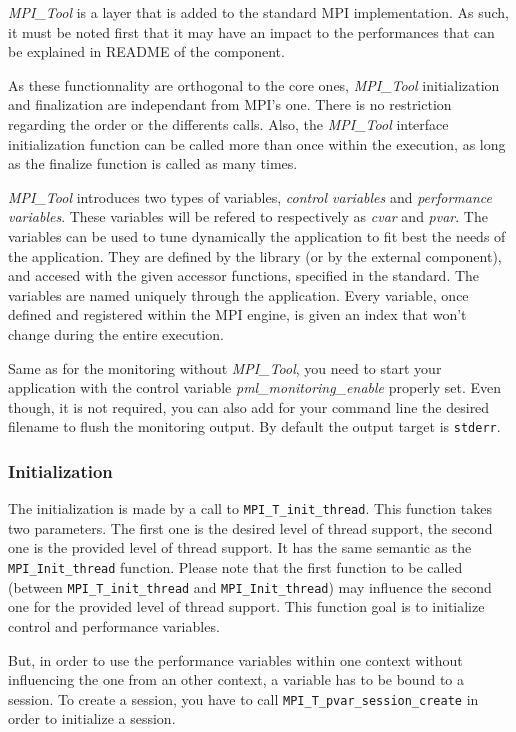 \documentclass[notitlepage]{article}
\newcommand{\mpit}[1]{\textit{MPI\_Tool#1}}
\begin{document}
\mpit{} is a layer that is added to the standard MPI
implementation. As such, it must be noted first that it may have an
impact to the performances that can be explained in README of the
component.

As these functionnality are orthogonal to the core ones, \mpit{}
initialization and finalization are independant from MPI's one. There
is no restriction regarding the order or the differents calls. Also,
the \mpit{} interface initialization function can be called more than
once within the execution, as long as the finalize function is called
as many times.

\mpit{} introduces two types of variables, \textit{control variables}
and \textit{performance variables}. These variables will be refered to
respectively as \textit{cvar} and \textit{pvar}. The variables can be
used to tune dynamically the application to fit best the needs of the
application. They are defined by the library (or by the external
component), and accesed with the given accessor functions, specified
in the standard. The variables are named uniquely through the
application. Every variable, once defined and registered within the
MPI engine, is given an index that won't change during the entire
execution.

Same as for the monitoring without \mpit{}, you need to start your
application with the control variable \textit{pml\_monitoring\_enable}
properly set. Even though, it is not required, you can also add for
your command line the desired filename to flush the monitoring
output. By default the output target is \texttt{stderr}.

\subsubsection{Initialization}

The initialization is made by a call to
\texttt{MPI\_T\_init\_thread}. This function takes two parameters. The
first one is the desired level of thread support, the second one is
the provided level of thread support. It has the same semantic as the
\texttt{MPI\_Init\_thread} function. Please note that the first
function to be called (between \texttt{MPI\_T\_init\_thread} and
\texttt{MPI\_Init\_thread}) may influence the second one for the
provided level of thread support. This function goal is to initialize
control and performance variables.

But, in order to use the performance variables within one context
without influencing the one from an other context, a variable has to
be bound to a session. To create a session, you have to call
\texttt{MPI\_T\_pvar\_session\_create} in order to initialize a session.
\end{document}
